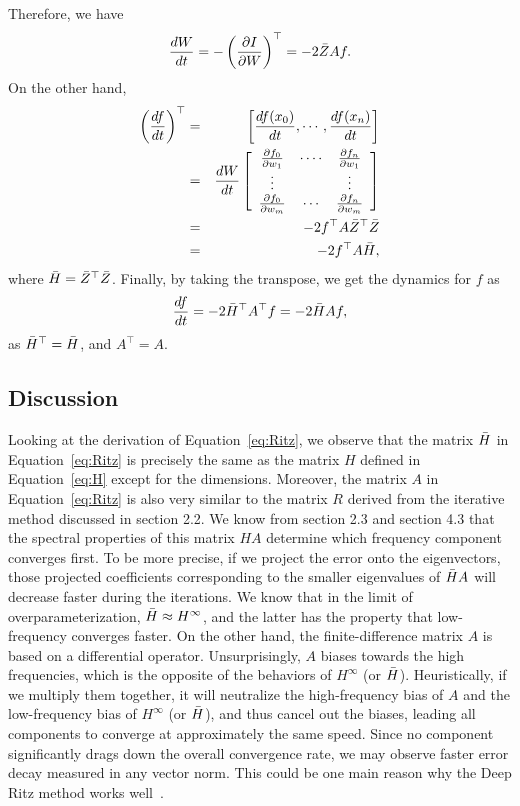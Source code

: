 \documentclass[letterpaper,12pt]{article}
\begin{document}
Therefore, we have 
\begin{eqnarray}
\frac{dW}{dt}
=-\left(\frac{\partial I}{\partial W}\right)^{\top}=-2\Bar{Z}Af.
\end{eqnarray}
On the other hand,
\begin{eqnarray}
\left(\frac{d f}{d t}\right)^{\top}&=&\left[\frac{d f(x_{0})}{d t}, \cdots, \frac{d f(x_{n})}{d t}\right] \\
&=& \frac{dW}{dt}\left[\begin{array}{ccc}
\frac{\partial f_{0}}{\partial w_{1}} & \cdots \cdot & \frac{\partial f_{n}}{\partial w_{1}}\\
\vdots&&\vdots\\
\frac{\partial f_{0}}{\partial w_{m}} & \cdots & \frac{\partial f_{n}}{\partial w_{m}}
\end{array}\right]\\
&=&-2 f^{\top} A \Bar{Z}^{\top}\Bar{Z}\\
&=&-2 f^{\top} A\Bar{H},
\end{eqnarray}
where $\Bar{H}=\Bar{Z}^{\top}\Bar{Z}$.
Finally, by taking the transpose, we get the dynamics for $f$ as
\begin{equation}\label{eq:Ritz}
    \frac{d f}{d t}=-2\Bar{H}^{\top}A^{\top}f=-2\Bar{H}Af,
\end{equation}
as $\Bar{H}^{\top}=\Bar{H}$, and $A^{\top}=A$.

\subsection{Discussion}
Looking at the derivation of Equation~\eqref{eq:Ritz}, we observe that the matrix $\Bar{H}$ in Equation~\eqref{eq:Ritz} is precisely the same as the matrix $H$ defined in Equation~\eqref{eq:H} except for the dimensions. Moreover, the matrix $A$ in Equation~\eqref{eq:Ritz} is also very similar to the matrix $R$ derived from the iterative method discussed in section 2.2. We know from section 2.3 and section 4.3 that the spectral properties of this matrix $HA$ determine which frequency component converges first. To be more precise, if we project the error onto the eigenvectors, those projected coefficients corresponding to the smaller eigenvalues of $\Bar{H}A$ will decrease faster during the iterations. We know that in the limit of overparameterization, $\Bar{H}\approx H^\infty$, and the latter has the property that low-frequency converges faster.
On the other hand, the finite-difference matrix $A$ is based on a differential operator. Unsurprisingly, $A$ biases towards the high frequencies, which is the opposite of the behaviors of $H^\infty$ (or $\Bar H$). Heuristically, if we multiply them together, it will neutralize the high-frequency bias of $A$ and the low-frequency bias of $H^\infty$ (or $\Bar H$), and thus cancel out the biases, leading all components to converge at approximately the same speed. Since no component significantly drags down the overall convergence rate, we may observe faster error decay measured in any vector norm. This could be one main reason why the Deep Ritz method works well~\cite{e2017deep}.
\end{document}
